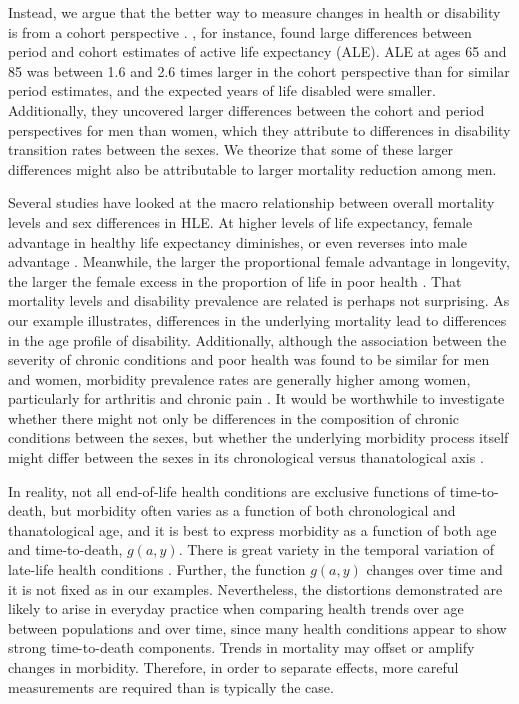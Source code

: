 \documentclass[11pt,oneside,a4paper]{article} %
\begin{document}
Instead, we argue that the better way to measure changes in health or disability is from a cohort perspective \citep{Manton2000,Manton2008,Christensen2013}. \citet{Manton2000}, for instance, found large differences between period and cohort estimates of active life expectancy (ALE). ALE at ages 65 and 85 was between 1.6 and 2.6 times larger in the cohort perspective than for similar period estimates, and the expected years of life disabled were smaller. Additionally, they uncovered larger differences between the cohort and period perspectives for men than women, which they attribute to differences in disability transition rates between the sexes. We theorize that some of these larger differences might also be attributable to larger mortality reduction among men.

Several studies have looked at the macro relationship between overall mortality levels and sex differences in HLE. At higher levels of life expectancy, female advantage in healthy life expectancy diminishes, or even reverses into male advantage \citep{vanOyen2013}. Meanwhile, the larger the proportional female advantage in longevity, the larger the female excess in the proportion of life in poor health \citep{Luy2014}. That mortality levels and disability prevalence are related is perhaps not surprising. As our example illustrates, differences in the underlying mortality lead to differences in the age profile of disability. Additionally, although the association between the severity of chronic conditions and poor health was found to be similar for men and women, morbidity prevalence rates are generally higher among women, particularly for arthritis and chronic pain \citep{Case2005}. It would be worthwhile to investigate whether there might not only be differences in the composition of chronic conditions between the sexes, but whether the underlying morbidity process itself might differ between the sexes in its chronological versus thanatological axis \citep{riffe2015ttd}. 

In reality, not all end-of-life health conditions are exclusive functions of
time-to-death, but morbidity often varies as a function of
both chronological and thanatological age, and it is best to express morbidity
as a function of both age and time-to-death, $g(a,y)$. There is great variety in
the temporal variation of late-life health conditions \citep{riffe2015ttd}.
Further, the function $g(a,y)$ changes over time and it is not fixed as in our examples. Nevertheless, the distortions demonstrated are likely to arise in everyday practice when comparing health trends over age between populations
and over time, since many health conditions appear to show strong time-to-death
components. Trends in mortality may offset or amplify changes in morbidity.
Therefore, in order to separate effects, more careful measurements are required
than is typically the case. 
\end{document}
